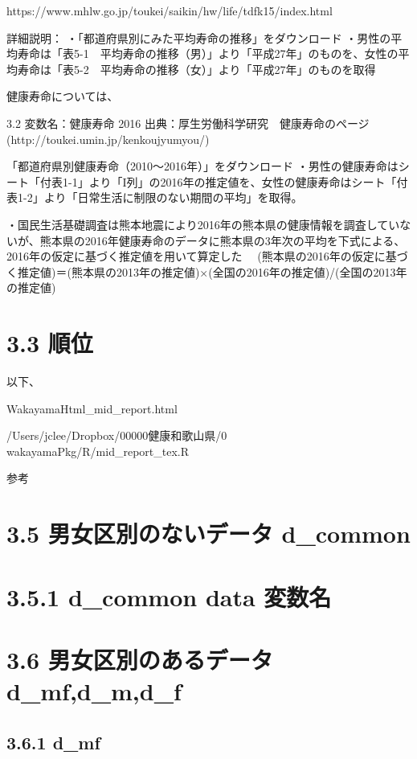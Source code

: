 https://www.mhlw.go.jp/toukei/saikin/hw/life/tdfk15/index.html

詳細説明： ・「都道府県別にみた平均寿命の推移」をダウンロード ・男性の平均寿命は「表5-1　平均寿命の推移（男）」より「平成27年」のものを、女性の平均寿命は「表5-2　平均寿命の推移（女）」より「平成27年」のものを取得


健康寿命については、

3.2 変数名：健康寿命 2016
出典：厚生労働科学研究　健康寿命のページ(http://toukei.umin.jp/kenkoujyumyou/)

「都道府県別健康寿命（2010～2016年）」をダウンロード ・男性の健康寿命はシート「付表1-1」より「I列」の2016年の推定値を、女性の健康寿命はシート「付表1-2」より「日常生活に制限のない期間の平均」を取得。

・国民生活基礎調査は熊本地震により2016年の熊本県の健康情報を調査していないが、熊本県の2016年健康寿命のデータに熊本県の3年次の平均を下式による、2016年の仮定に基づく推定値を用いて算定した 　(熊本県の2016年の仮定に基づく推定値)＝(熊本県の2013年の推定値)×(全国の2016年の推定値)/(全国の2013年の推定値)




\section{3.3 順位}



以下、

WakayamaHtml\_mid\_report.html

/Users/jclee/Dropbox/00000健康和歌山県/0 wakayamaPkg/R/mid\_report\_tex.R

参考





\section{3.5 男女区別のないデータ d\_common}

\section{3.5.1 d\_common data 変数名}


\section{3.6 男女区別のあるデータ d\_mf,d\_m,d\_f}

\subsection{3.6.1 d\_mf}



